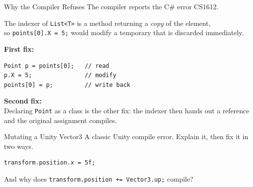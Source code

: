 \begin{solutionframe}{Why the Compiler Refuses}
  The compiler reports the C\# error CS1612.
  \vspace{1ex}

  The indexer of \texttt{List<T>} is a method returning a \emph{copy} of the
  element,\\
  so \texttt{points[0].X = 5;} would modify a temporary that is
  discarded immediately.\\
  \vspace{1ex}
  \pause

  \textbf{First fix:}\\
  \begin{lstlisting}[basicstyle=\scriptsize\ttfamily]
Point p = points[0];   // read
p.X = 5;               // modify
points[0] = p;         // write back
  \end{lstlisting}
  \pause

  \textbf{Second fix:}\\
  Declaring \texttt{Point} as a class is the other fix: the indexer then hands
  out a reference and the original assignment compiles.
  \vspace{3ex}
  \pause

\end{solutionframe}

\begin{exerciseframe}{Mutating a Unity Vector3}
  A classic Unity compile error. Explain it, then fix it in two ways.
  \vspace{1ex}

  \begin{lstlisting}[basicstyle=\scriptsize\ttfamily]
transform.position.x = 5f;
  \end{lstlisting}
  And why does \texttt{transform.position += Vector3.up;} compile?
\end{exerciseframe}

